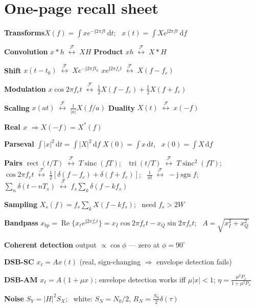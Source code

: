 \documentclass[11pt,a4paper]{article}
\newcommand{\FT}{\;\stackrel{\mathcal{F}}{\longleftrightarrow}\;}
\newcommand{\sinc}{\operatorname{sinc}}
\newcommand{\rect}{\operatorname{rect}}
\newcommand{\tri}{\operatorname{tri}}
\newcommand{\sgn}{\operatorname{sgn}}
\newcommand{\dd}{\,\mathrm{d}}
\newcommand{\ii}{\mathrm{j}}
\begin{document}
\section{One-page recall sheet}

\begin{keybox}
\textbf{Transforms}\quad $X(f)=\int x e^{-\ii2\pi ft}\dd t$; \ $x(t)=\int Xe^{\ii2\pi ft}\dd f$

\textbf{Convolution} $x*h\FT XH$ \quad\textbf{Product} $xh\FT X*H$

\textbf{Shift} $x(t-t_0)\FT Xe^{-\ii2\pi ft_0}$ \quad $xe^{\ii2\pi f_ct}\FT X(f-f_c)$

\textbf{Modulation} $x\cos2\pi f_ct\FT \tfrac12X(f-f_c)+\tfrac12X(f+f_c)$

\textbf{Scaling} $x(at)\FT\frac{1}{|a|}X(f/a)$ \quad\textbf{Duality} $X(t)\FT x(-f)$

\textbf{Real $x$} $\Rightarrow X(-f)=X^*(f)$

\textbf{Parseval} $\int|x|^2\dd t=\int|X|^2\dd f$ \quad $X(0)=\int x\dd t$, \ $x(0)=\int X\dd f$

\medskip
\textbf{Pairs} $\rect(t/T)\FT T\sinc(fT)$; \ $\tri(t/T)\FT T\sinc^2(fT)$; \
$\cos2\pi f_ct\FT\tfrac12[\delta(f-f_c)+\delta(f+f_c)]$; \
$\frac{1}{\pi t}\FT-\ii\sgn f$; \ $\sum_n\delta(t-nT_s)\FT f_s\sum_k\delta(f-kf_s)$

\medskip
\textbf{Sampling} $X_s(f)=f_s\sum_kX(f-kf_s)$; \ need $f_s>2W$

\textbf{Bandpass} $x_{bp}=\operatorname{Re}\{x_\ell e^{\ii2\pi f_ct}\}=x_I\cos2\pi f_ct-x_Q\sin2\pi f_ct$;
\ $A=\sqrt{x_I^2+x_Q^2}$

\textbf{Coherent detection} output $\propto\cos\phi$ --- zero at $\phi=90^\circ$

\textbf{DSB-SC} $x_\ell=Ax(t)$ (real, sign-changing $\Rightarrow$ envelope detection fails)

\textbf{DSB-AM} $x_\ell=A(1+\mu x)$; envelope detection works iff $\mu|x|<1$; $\eta=\frac{\mu^2P_x}{1+\mu^2P_x}$

\textbf{Noise} $S_Y=|H|^2S_X$; \ white: $S_N=N_0/2$, $R_N=\frac{N_0}{2}\delta(\tau)$
\end{keybox}
\end{document}
